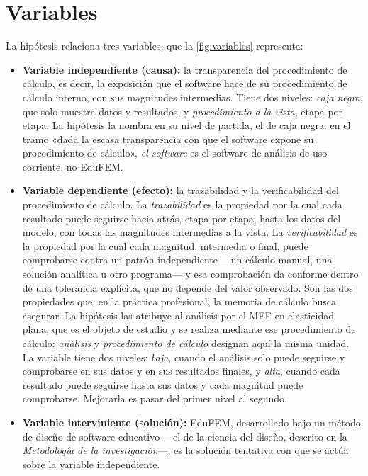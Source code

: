 \section*{Variables}

La hipótesis relaciona tres variables, que la \autoref{fig:variables} representa:
\begin{itemize}
    \item \textbf{Variable independiente (causa):} la transparencia del procedimiento de cálculo, es decir, la exposición que el software hace de su procedimiento de cálculo interno, con sus magnitudes intermedias. Tiene dos niveles: \emph{caja negra}, que solo muestra datos y resultados, y \emph{procedimiento a la vista}, etapa por etapa. La hipótesis la nombra en su nivel de partida, el de caja negra: en el tramo «dada la escasa transparencia con que el software expone su procedimiento de cálculo», \emph{el software} es el software de análisis de uso corriente, no EduFEM.
    \item \textbf{Variable dependiente (efecto):} la trazabilidad y la verificabilidad del procedimiento de cálculo. La \emph{trazabilidad} es la propiedad por la cual cada resultado puede seguirse hacia atrás, etapa por etapa, hasta los datos del modelo, con todas las magnitudes intermedias a la vista. La \emph{verificabilidad} es la propiedad por la cual cada magnitud, intermedia o final, puede comprobarse contra un patrón independiente ---un cálculo manual, una solución analítica u otro programa--- y esa comprobación da conforme dentro de una tolerancia explícita, que no depende del valor observado. Son las dos propiedades que, en la práctica profesional, la memoria de cálculo busca asegurar. La hipótesis las atribuye al análisis por el MEF en elasticidad plana, que es el objeto de estudio y se realiza mediante ese procedimiento de cálculo: \emph{análisis} y \emph{procedimiento de cálculo} designan aquí la misma unidad. La variable tiene dos niveles: \emph{baja}, cuando el análisis solo puede seguirse y comprobarse en sus datos y en sus resultados finales, y \emph{alta}, cuando cada resultado puede seguirse hasta sus datos y cada magnitud puede comprobarse. Mejorarla es pasar del primer nivel al segundo.
    \item \textbf{Variable interviniente (solución):} EduFEM, desarrollado bajo un método de diseño de software educativo ---el de la ciencia del diseño, descrito en la \emph{Metodología de la investigación}---, es la solución tentativa con que se actúa sobre la variable independiente.
\end{itemize}

